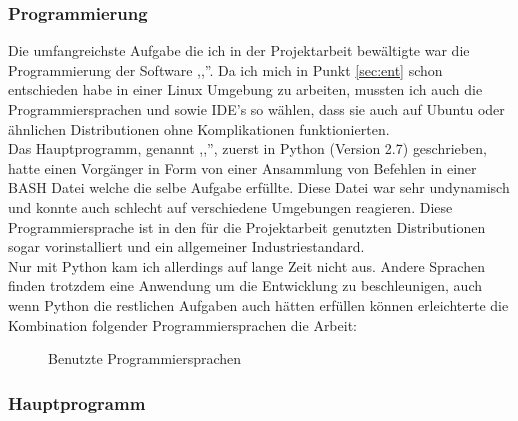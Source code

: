 \subsubsection{Programmierung}
Die umfangreichste Aufgabe die ich in der Projektarbeit bewältigte
war die Programmierung der Software ,,\vs ''.
Da ich mich in Punkt \ref{sec:ent} schon entschieden habe in einer Linux Umgebung zu arbeiten,
mussten ich auch die Programmiersprachen und sowie IDE's so wählen,
dass sie auch auf Ubuntu oder ähnlichen Distributionen ohne Komplikationen funktionierten.\\
Das Hauptprogramm, genannt ,,\vs '', zuerst in
Python (Version 2.7) \cite{python27} geschrieben, hatte einen Vorgänger in Form von einer
Ansammlung von Befehlen in einer BASH Datei welche die selbe Aufgabe erfüllte.
Diese Datei war sehr undynamisch und konnte auch schlecht auf verschiedene
Umgebungen reagieren.
Diese Programmiersprache ist in den für die Projektarbeit genutzten Distributionen
sogar vorinstalliert und ein allgemeiner Industriestandard.\\
Nur mit Python kam ich allerdings auf lange Zeit nicht aus.
Andere Sprachen finden trotzdem eine Anwendung um die Entwicklung zu beschleunigen,
auch wenn Python die restlichen Aufgaben auch hätten erfüllen können
erleichterte die Kombination folgender Programmiersprachen die Arbeit:
\begin{figure}[H]

\label{fig:pyvi}
\caption{Benutzte Programmiersprachen}
\end{figure}

\subsubsection*{Hauptprogramm}







